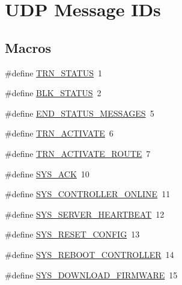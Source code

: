 \hypertarget{group___u_d_p_message_i_d}{}\section{U\+DP Message I\+Ds}
\label{group___u_d_p_message_i_d}
\subsection*{Macros}
\begin{DoxyCompactItemize}
\item 
\#define \hyperlink{group___u_d_p_message_i_d_gacf1beacf20d9d977b8a27878039d43d7}{T\+R\+N\+\_\+\+S\+T\+A\+T\+US}~1
\item 
\#define \hyperlink{group___u_d_p_message_i_d_gaf8a3426c6f740f351255d50cdda3c9f8}{B\+L\+K\+\_\+\+S\+T\+A\+T\+US}~2
\item 
\#define \hyperlink{group___u_d_p_message_i_d_gab92fe1aa1c17f0c4e37cf31e79fb1419}{E\+N\+D\+\_\+\+S\+T\+A\+T\+U\+S\+\_\+\+M\+E\+S\+S\+A\+G\+ES}~5
\item 
\#define \hyperlink{group___u_d_p_message_i_d_gab5a0eacfbf0cfab134534d10890d5c25}{T\+R\+N\+\_\+\+A\+C\+T\+I\+V\+A\+TE}~6
\item 
\#define \hyperlink{group___u_d_p_message_i_d_ga44d53121d88631ed14d77f8b6a405816}{T\+R\+N\+\_\+\+A\+C\+T\+I\+V\+A\+T\+E\+\_\+\+R\+O\+U\+TE}~7
\item 
\#define \hyperlink{group___u_d_p_message_i_d_gaf3b0535ed1fed9f9dfb92b18ff78956c}{S\+Y\+S\+\_\+\+A\+CK}~10
\item 
\#define \hyperlink{group___u_d_p_message_i_d_ga23aab89076591390a1dbc412a3a07314}{S\+Y\+S\+\_\+\+C\+O\+N\+T\+R\+O\+L\+L\+E\+R\+\_\+\+O\+N\+L\+I\+NE}~11
\item 
\#define \hyperlink{group___u_d_p_message_i_d_gaddd0be32c40eb5aa6ff7247ec41d402d}{S\+Y\+S\+\_\+\+S\+E\+R\+V\+E\+R\+\_\+\+H\+E\+A\+R\+T\+B\+E\+AT}~12
\item 
\#define \hyperlink{group___u_d_p_message_i_d_ga30863a10d0fcf12b2664d572864c4e0f}{S\+Y\+S\+\_\+\+R\+E\+S\+E\+T\+\_\+\+C\+O\+N\+F\+IG}~13
\item 
\#define \hyperlink{group___u_d_p_message_i_d_gae5a140537bdeb16c6f8ac38ee7a841f6}{S\+Y\+S\+\_\+\+R\+E\+B\+O\+O\+T\+\_\+\+C\+O\+N\+T\+R\+O\+L\+L\+ER}~14
\item 
\#define \hyperlink{group___u_d_p_message_i_d_ga88b6f619a28320e9136847e9b1b27a36}{S\+Y\+S\+\_\+\+D\+O\+W\+N\+L\+O\+A\+D\+\_\+\+F\+I\+R\+M\+W\+A\+RE}~15
\item 

\end{DoxyCompactItemize}
